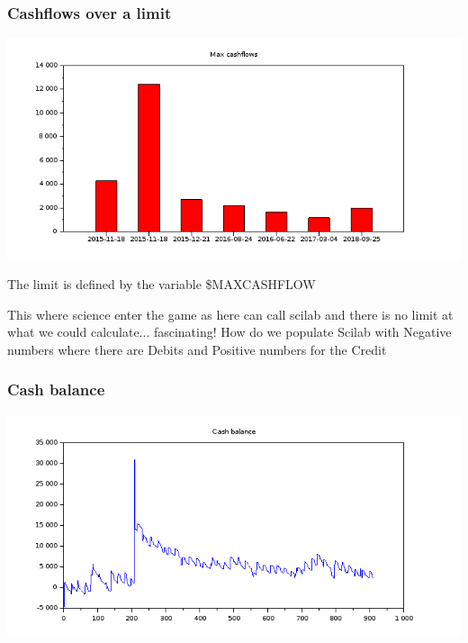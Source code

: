 \documentclass[8pt]{article} %
\begin{document}
%

%

%

%

\subsubsection{Cashflows over a limit}
\includegraphics[scale=0.6]{../Maths/Vector.png}

The limit is defined by the variable \$MAXCASHFLOW

This where science enter the game as here can call scilab and there is no limit at what we could calculate... fascinating!
How do we populate Scilab with Negative numbers where there are Debits and Positive numbers for the Credit
\subsubsection{Cash balance}
\includegraphics[scale=0.6]{Scilab-cashBalance.png}
\end{document}
